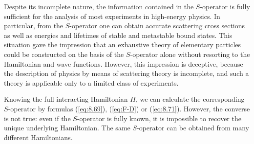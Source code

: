 \documentclass[]{stefan1}
\begin{document}
Despite its incomplete nature, the information contained in the $ S
$-operator is fully sufficient for the analysis of most experiments in
high-energy physics. In particular, from the $ S $-operator one can
obtain accurate scattering cross sections as well as energies and
lifetimes of stable and metastable bound states. This situation gave the
impression that an exhaustive theory of elementary particles could be
constructed on the basis of the $ S $-operator alone without resorting
to the Hamiltonian and wave functions. However, this impression is
deceptive, because the description of physics by means of scattering
theory is incomplete, and such a theory is applicable only to a limited
class of experiments.

Knowing the full interacting Hamiltonian $ H $, we can calculate the
corresponding $ S $-operator by formulas (\ref{eq:8.69}), (\ref{eq:F-D})
or (\ref{eq:8.71}). However, the converse is not true: even if the
$ S $-operator is fully known, it is impossible to recover the unique
underlying Hamiltonian. The same $ S $-operator can be obtained from
many different Hamiltonians.
\end{document}
